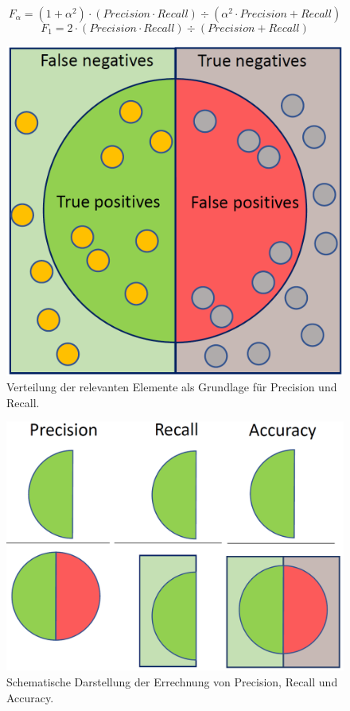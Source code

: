 \begin{equation}
F_\alpha = (1 + \alpha^2) \cdot (Precision \cdot Recall) \div (\alpha^2 \cdot Precision + Recall) 
\label{eq:f1} 
\end{equation}
\begin{equation}
F_1 = 2 \cdot (Precision \cdot Recall) \div (Precision + Recall) 
\label{eq:f1b} 
\end{equation}
\begin{figure}[H]
\centering
\includegraphics[scale=0.25]{pictures/grafiken/PrecisionRecall}
\caption{Verteilung der relevanten Elemente als Grundlage für Precision und Recall.}
\label{fig:prerec}
\end{figure}
\begin{figure}[H]
\centering
\includegraphics[scale=0.25]{pictures/grafiken/prerecacc}
\caption{Schematische Darstellung der Errechnung von Precision, Recall und Accuracy.}
\label{fig:prerecacc}
\end{figure}

